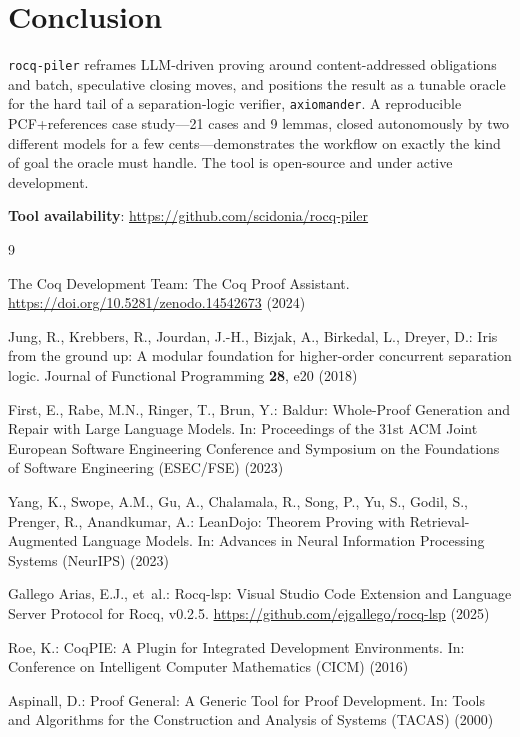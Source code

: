 \documentclass[11pt,a4paper]{article}
\newcommand{\tool}{\texttt{rocq-piler}\xspace}
\newcommand{\axm}{\texttt{axiomander}\xspace}
\begin{document}
\section{Conclusion}

\tool reframes LLM-driven proving around content-addressed obligations and
batch, speculative closing moves, and positions the result as a tunable oracle
for the hard tail of a separation-logic verifier, \axm. A reproducible PCF+references
case study---21 cases and 9 lemmas, closed autonomously by two different models
for a few cents---demonstrates the workflow on exactly the kind of goal the
oracle must handle. The tool is open-source and under active development.

\textbf{Tool availability}: \url{https://github.com/scidonia/rocq-piler}


\begin{thebibliography}{9}

{The Coq Development Team}:
The Coq Proof Assistant.
\url{https://doi.org/10.5281/zenodo.14542673} (2024)

Jung, R., Krebbers, R., Jourdan, J.-H., Bizjak, A., Birkedal, L., Dreyer, D.:
Iris from the ground up: A modular foundation for higher-order concurrent
separation logic.
Journal of Functional Programming \textbf{28}, e20 (2018)

First, E., Rabe, M.N., Ringer, T., Brun, Y.:
Baldur: Whole-Proof Generation and Repair with Large Language Models.
In: Proceedings of the 31st ACM Joint European Software Engineering Conference and Symposium on the Foundations of Software Engineering (ESEC/FSE) (2023)

Yang, K., Swope, A.M., Gu, A., Chalamala, R., Song, P., Yu, S., Godil, S., Prenger, R., Anandkumar, A.:
LeanDojo: Theorem Proving with Retrieval-Augmented Language Models.
In: Advances in Neural Information Processing Systems (NeurIPS) (2023)

Gallego Arias, E.J., et~al.:
Rocq-lsp: Visual Studio Code Extension and Language Server Protocol for Rocq, v0.2.5.
\url{https://github.com/ejgallego/rocq-lsp} (2025)

Roe, K.:
CoqPIE: A Plugin for Integrated Development Environments.
In: Conference on Intelligent Computer Mathematics (CICM) (2016)

Aspinall, D.:
Proof General: A Generic Tool for Proof Development.
In: Tools and Algorithms for the Construction and Analysis of Systems (TACAS) (2000)

\end{thebibliography}
\end{document}
